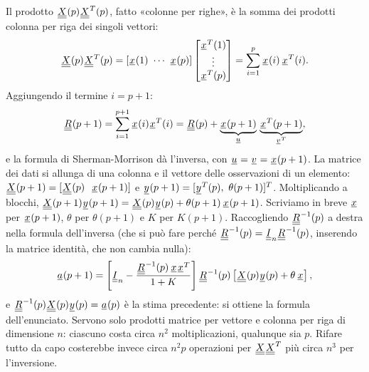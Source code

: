 \begin{dimostrazione}
 Il prodotto $\matr{X}(p)\matr{X}^T(p)$, fatto «colonne per righe», è la somma dei
prodotti colonna per riga dei singoli vettori:
\[ \matr{X}(p)\matr{X}^T(p) = \left[ \vett{x}(1)\ \cdots\ \vett{x}(p) \right] \begin{bmatrix} \vett{x}^T(1) \\ \vdots
   \\ \vett{x}^T(p) \end{bmatrix} = \sum_{i=1}^{p} \vett{x}(i)\, \vett{x}^T(i) . \]
 Aggiungendo il termine $i = p + 1$:
\[ \matr{R}(p + 1) = \sum_{i=1}^{p+1} \vett{x}(i)\vett{x}^T(i) = \matr{R}(p) + \underbrace{\vett{x}(p +
   1)}_{\vett{u}}\, \underbrace{\vett{x}^T(p + 1)}_{\vett{v}^T} , \]
e la formula di Sherman-Morrison dà l'inversa, con $\vett{u} = \vett{v} = \vett{x}(p + 1)$.
 La matrice dei dati si allunga di una colonna e il vettore delle osservazioni di
un elemento: $\matr{X}(p + 1) = [\matr{X}(p)\ \ \vett{x}(p + 1)]$ e $\vett{y}(p + 1) = [\vett{y}^T(p),\ \theta(p +
1)]^T$. Moltiplicando a blocchi, $\matr{X}(p + 1)\vett{y}(p + 1) = \matr{X}(p)\vett{y}(p) + \theta(p + 1)\, \vett{x}(p +
1)$.
 Scriviamo in breve $\vett{x}$ per $\vett{x}(p + 1)$, $\theta$ per $\theta(p + 1)$ e $K$ per
$K(p + 1)$. Raccogliendo $\matr{R}^{-1}(p)$ a destra nella formula dell'inversa (che si può fare perché
$\matr{R}^{-1}(p) = \matr{I}_n \matr{R}^{-1}(p)$, inserendo la matrice identità, che non cambia nulla):
\[ \vett{a}(p + 1) = \left[ \matr{I}_n - \frac{\matr{R}^{-1}(p)\, \vett{x}\vett{x}^T}{1 + K} \right] \matr{R}^{-1}(p)
   \left[ \matr{X}(p)\vett{y}(p) + \theta\, \vett{x} \right] , \]
e $\matr{R}^{-1}(p)\matr{X}(p)\vett{y}(p) = \vett{a}(p)$ è la stima precedente: si ottiene la formula dell'enunciato.
 Servono solo prodotti matrice per vettore e colonna per riga di dimensione $n$: ciascuno costa circa
$n^2$ moltiplicazioni, qualunque sia $p$. Rifare tutto da capo costerebbe invece circa $n^2 p$ operazioni per
$\matr{X}\matr{X}^T$ più circa $n^3$ per l'inversione.
\end{dimostrazione}

